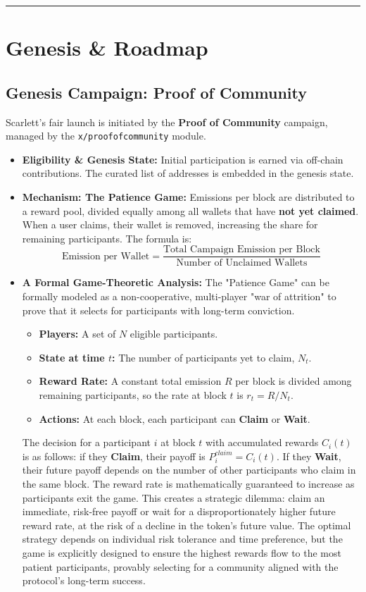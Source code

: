 \documentclass[10pt]{article}
\begin{document}
\hrule
\vspace{1em}
\section{Genesis \& Roadmap}

\subsection{Genesis Campaign: Proof of Community}
Scarlett's fair launch is initiated by the \textbf{Proof of Community} campaign, managed by the \texttt{x/proofofcommunity} module.
\begin{itemize}[leftmargin=*, itemsep=2pt]
    \item \textbf{Eligibility \& Genesis State:} Initial participation is earned via off-chain contributions. The curated list of addresses is embedded in the genesis state.
    \item \textbf{Mechanism: The Patience Game:} Emissions per block are distributed to a reward pool, divided equally among all wallets that have \textbf{not yet claimed}. When a user claims, their wallet is removed, increasing the share for remaining participants. The formula is: 
    \[ \text{Emission per Wallet} = \frac{\text{Total Campaign Emission per Block}}{\text{Number of Unclaimed Wallets}} \]
    \item \textbf{A Formal Game-Theoretic Analysis:} The "Patience Game" can be formally modeled as a non-cooperative, multi-player "war of attrition" to prove that it selects for participants with long-term conviction.
    \begin{itemize}
        \item \textbf{Players:} A set of \(N\) eligible participants.
        \item \textbf{State at time \(t\):} The number of participants yet to claim, \(N_t\).
        \item \textbf{Reward Rate:} A constant total emission \(R\) per block is divided among remaining participants, so the rate at block \(t\) is \(r_t = R / N_t\).
        \item \textbf{Actions:} At each block, each participant can \textbf{Claim} or \textbf{Wait}.
    \end{itemize}
    The decision for a participant \(i\) at block \(t\) with accumulated rewards \(C_i(t)\) is as follows: if they \textbf{Claim}, their payoff is \(P_i^{claim} = C_i(t)\). If they \textbf{Wait}, their future payoff depends on the number of other participants who claim in the same block. The reward rate is mathematically guaranteed to increase as participants exit the game. This creates a strategic dilemma: claim an immediate, risk-free payoff or wait for a disproportionately higher future reward rate, at the risk of a decline in the token's future value. The optimal strategy depends on individual risk tolerance and time preference, but the game is explicitly designed to ensure the highest rewards flow to the most patient participants, provably selecting for a community aligned with the protocol's long-term success.

\end{itemize}
\end{document}
